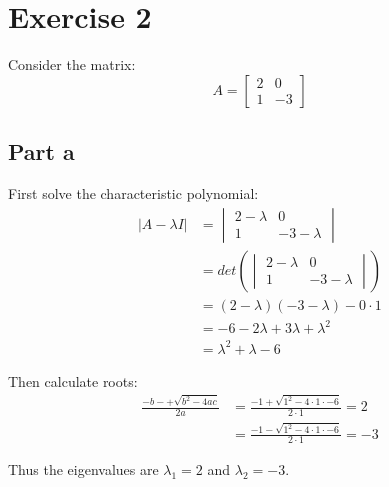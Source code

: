 \section{Exercise 2}
Consider the matrix:
\[
	A = \begin{bmatrix} 2 & 0 \\ 1 & -3 \end{bmatrix}
\]

\subsection{Part a}

First solve the characteristic polynomial:
\begin{align*}
	|A-\lambda I| & = \begin{vmatrix}
		                  2-\lambda & 0          \\
		                  1         & -3-\lambda
	                  \end{vmatrix}               \\
	              & = det\left(\begin{vmatrix}
		                           2-\lambda & 0          \\
		                           1         & -3-\lambda
	                           \end{vmatrix}\right)      \\
	              & = (2-\lambda)(-3-\lambda) - 0\cdot 1   \\
	              & = -6 - 2\lambda + 3\lambda + \lambda^2 \\
	              & = \lambda^2 + \lambda - 6
\end{align*}

Then calculate roots:
\begin{align*}
	\frac{-b -+ \sqrt{b^2-4ac}}{2a} & = \frac{-1 + \sqrt{1^2-4\cdot 1\cdot -6}}{2\cdot 1} = 2  \\
	                                & = \frac{-1 - \sqrt{1^2-4\cdot 1\cdot -6}}{2\cdot 1} = -3
\end{align*}

Thus the eigenvalues are $\lambda_1 = 2$ and $\lambda_2 = -3$.

